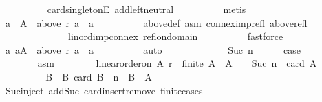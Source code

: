\begin{isabellebody}
\ \ \ \ \ \ \ \ \isamarkupfalse%
\ card{\isacharunderscore}{\kern0pt}{}{\isacharunderscore}{\kern0pt}singletonE\ add{\isachardot}{\kern0pt}left{\isacharunderscore}{\kern0pt}neutral\isanewline
\ \ \ \ \ \ \ \ \isamarkupfalse%
\ metis\isanewline
\ \ \ \ \ \ \isamarkupfalse%
\ {\isachardoublequoteopen}a\ {\isasymin}\ A\ {\isasymand}\ above\ r\ a\ {\isacharequal}{\kern0pt}\ {\isacharbraceleft}{\kern0pt}a{\isacharbraceright}{\kern0pt}{\isachardoublequoteclose}\isanewline
\ \ \ \ \ \ \ \ \isamarkupfalse%
\ above{\isacharunderscore}{\kern0pt}def\ asm\ connex{\isacharunderscore}{\kern0pt}imp{\isacharunderscore}{\kern0pt}refl\ above{\isacharunderscore}{\kern0pt}refl\isanewline
\ \ \ \ \ \ \ \ \ \ \ \ \ \ lin{\isacharunderscore}{\kern0pt}ord{\isacharunderscore}{\kern0pt}imp{\isacharunderscore}{\kern0pt}connex\ refl{\isacharunderscore}{\kern0pt}on{\isacharunderscore}{\kern0pt}domain\isanewline
\ \ \ \ \ \ \ \ \isamarkupfalse%
\ fastforce\isanewline
\ \ \ \ \ \ \isamarkupfalse%
\ {\isachardoublequoteopen}{\isasymexists}a{\isachardot}{\kern0pt}\ a{\isasymin}A\ {\isasymand}\ above\ r\ a\ {\isacharequal}{\kern0pt}\ {\isacharbraceleft}{\kern0pt}a{\isacharbraceright}{\kern0pt}{\isachardoublequoteclose}\isanewline
\ \ \ \ \ \ \ \ \isamarkupfalse%
\ auto\isanewline
\ \ \ \ \isamarkupfalse%
\isanewline
\ \ \isamarkupfalse%
\isanewline
\ \ \ \ \isamarkupfalse%
\ {\isacharparenleft}{\kern0pt}Suc\ n{\isacharparenright}{\kern0pt}\isanewline
\ \ \ \ \isamarkupfalse%
\ {\isacharquery}{\kern0pt}case\isanewline
\ \ \ \ \isamarkupfalse%
\isanewline
\ \ \ \ \ \ \isamarkupfalse%
\ asm{\isacharcolon}{\kern0pt}\isanewline
\ \ \ \ \ \ \ \ {\isachardoublequoteopen}linear{\isacharunderscore}{\kern0pt}order{\isacharunderscore}{\kern0pt}on\ A\ r\ {\isasymand}\ finite\ A\ {\isasymand}\ A\ {\isasymnoteq}\ {\isacharbraceleft}{\kern0pt}{\isacharbraceright}{\kern0pt}\ {\isasymand}\ Suc\ n{\isacharplus}{\kern0pt}{}\ {\isacharequal}{\kern0pt}\ card\ A{\isachardoublequoteclose}\isanewline
\ \ \ \ \ \ \isamarkupfalse%
\ \isamarkupfalse%
\ B\ \ B{\isacharcolon}{\kern0pt}\ {\isachardoublequoteopen}card\ B\ {\isacharequal}{\kern0pt}\ n{\isacharplus}{\kern0pt}{}\ {\isasymand}\ B\ {\isasymsubseteq}\ A{\isachardoublequoteclose}\isanewline
\ \ \ \ \ \ \ \ \isamarkupfalse%
\ Suc{\isacharunderscore}{\kern0pt}inject\ add{\isacharunderscore}{\kern0pt}Suc\ card{\isachardot}{\kern0pt}insert{\isacharunderscore}{\kern0pt}remove\ finite{\isachardot}{\kern0pt}cases\isanewline

\end{isabellebody}
